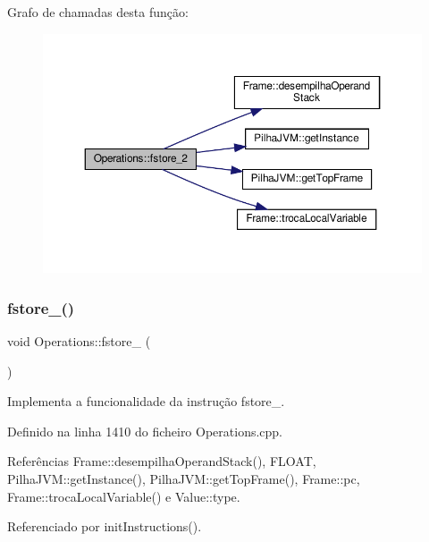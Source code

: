Grafo de chamadas desta função\+:\nopagebreak
\begin{figure}[H]
\begin{center}
\leavevmode
\includegraphics[width=350pt]{classOperations_a6d0a2faa9f164d49accf491a95364e2f_cgraph}
\end{center}
\end{figure}
\mbox{\label{classOperations_a00786621697e0e6e6c084c3cee1599ae}} 
\subsubsection{\texorpdfstring{fstore\+\_()}{fstore\_3()}}
{\footnotesize\ttfamily void Operations\+::fstore\+\_ (\begin{DoxyParamCaption}{ }\end{DoxyParamCaption})\hspace{0.3cm}{\ttfamily [private]}}



Implementa a funcionalidade da instrução fstore\+\_. 



Definido na linha 1410 do ficheiro Operations.\+cpp.



Referências Frame\+::desempilha\+Operand\+Stack(), F\+L\+O\+AT, Pilha\+J\+V\+M\+::get\+Instance(), Pilha\+J\+V\+M\+::get\+Top\+Frame(), Frame\+::pc, Frame\+::troca\+Local\+Variable() e Value\+::type.



Referenciado por init\+Instructions().

